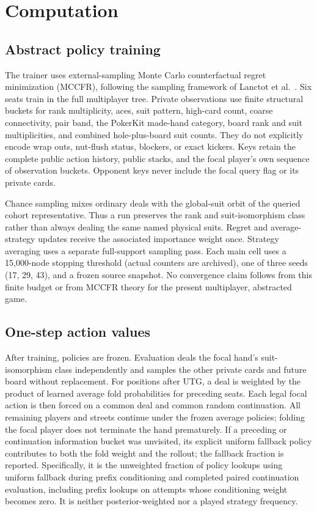 \documentclass[10pt]{article}
\begin{document}
\section{Computation}
\subsection{Abstract policy training}
The trainer uses external-sampling Monte Carlo counterfactual regret minimization (MCCFR), following
the sampling framework of Lanctot et al.~\cite{lanctot2009}. Six seats train in the full multiplayer
tree. Private observations use finite structural buckets for rank multiplicity, aces, suit pattern,
high-card count, coarse connectivity, pair band, the PokerKit made-hand category, board rank and suit
multiplicities, and combined hole-plus-board suit counts. They do not explicitly encode wrap outs,
nut-flush status, blockers, or exact kickers. Keys
retain the complete public action history, public stacks, and the focal player's own sequence of
observation buckets. Opponent keys never include the focal query flag or its private cards.

Chance sampling mixes ordinary deals with the global-suit orbit of the queried cohort representative.
Thus a run preserves the rank and suit-isomorphism class rather than always dealing the same named
physical suits. Regret
and average-strategy updates receive the associated importance weight once. Strategy averaging uses
a separate full-support sampling pass. Each main cell uses a 15,000-node stopping threshold (actual
counters are archived), one of three seeds (17, 29, 43), and a frozen source snapshot. No
convergence claim follows from this finite
budget or from MCCFR theory for the present multiplayer, abstracted game.

\subsection{One-step action values}
After training, policies are frozen. Evaluation deals the focal hand's suit-isomorphism class independently and samples
the other private cards and future board without replacement. For positions after UTG, a deal is
weighted by the product of learned average fold probabilities for preceding seats. Each legal focal
action is then forced on a common deal and common random continuation. All remaining players and
streets continue under the frozen average policies; folding the focal player does not terminate the
hand prematurely. If a preceding or continuation information bucket was unvisited, its explicit
uniform fallback policy contributes to both the fold weight and the rollout; the fallback fraction
is reported. Specifically, it is the unweighted fraction of policy lookups using uniform fallback
during prefix conditioning and completed paired continuation evaluation, including prefix lookups
on attempts whose conditioning weight becomes zero. It is neither posterior-weighted nor a played
strategy frequency.
\end{document}

